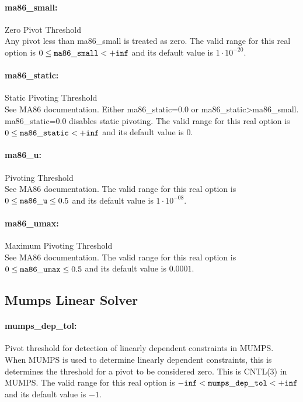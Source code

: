 \paragraph{ma86\_small:}\label{sec:ma86_small} Zero Pivot Threshold $\;$ \\
 Any pivot less than ma86\_small is treated as
zero. The valid range for this real option is 
$0 \le {\tt ma86\_small } <  {\tt +inf}$
and its default value is $1 \cdot 10^{-20}$.


\paragraph{ma86\_static:}\label{sec:ma86_static} Static Pivoting Threshold $\;$ \\
 See MA86 documentation. Either ma86\_static=0.0
or ma86\_static>ma86\_small. ma86\_static=0.0
disables static pivoting. The valid range for this real option is 
$0 \le {\tt ma86\_static } <  {\tt +inf}$
and its default value is $0$.


\paragraph{ma86\_u:}\label{sec:ma86_u} Pivoting Threshold $\;$ \\
 See MA86 documentation. The valid range for this real option is 
$0 \le {\tt ma86\_u } \le 0.5$
and its default value is $1 \cdot 10^{-08}$.


\paragraph{ma86\_umax:}\label{sec:ma86_umax} Maximum Pivoting Threshold $\;$ \\
 See MA86 documentation. The valid range for this real option is 
$0 \le {\tt ma86\_umax } \le 0.5$
and its default value is $0.0001$.


\subsection{Mumps Linear Solver}
\label{sec:Mumps_Linear_Solver}
\paragraph{mumps\_dep\_tol:}\label{sec:mumps_dep_tol} Pivot threshold for detection of linearly dependent constraints in MUMPS. $\;$ \\
 When MUMPS is used to determine linearly
dependent constraints, this is determines the
threshold for a pivot to be considered zero. 
This is CNTL(3) in MUMPS. The valid range for this real option is 
${\tt -inf} <  {\tt mumps\_dep\_tol } <  {\tt +inf}$
and its default value is $-1$.



